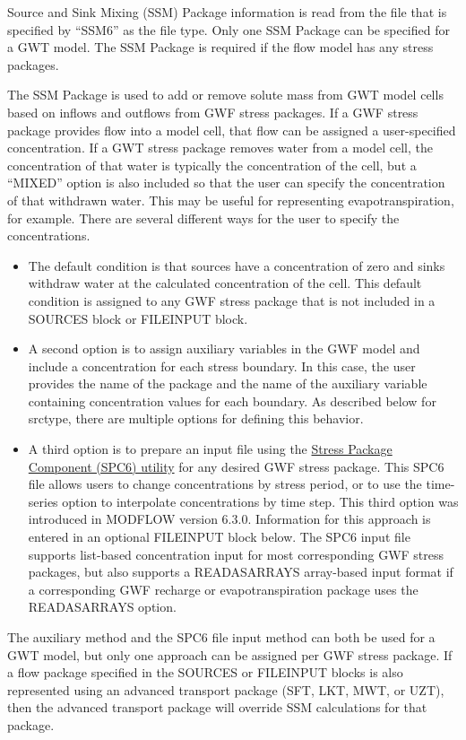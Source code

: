 Source and Sink Mixing (SSM) Package information is read from the file that is specified by ``SSM6'' as the file type.  Only one SSM Package can be specified for a GWT model.  The SSM Package is required if the flow model has any stress packages.

The SSM Package is used to add or remove solute mass from GWT model cells based on inflows and outflows from GWF stress packages.  If a GWF stress package provides flow into a model cell, that flow can be assigned a user-specified concentration.  If a GWT stress package removes water from a model cell, the concentration of that water is typically the concentration of the cell, but a ``MIXED'' option is also included so that the user can specify the concentration of that withdrawn water.  This may be useful for representing evapotranspiration, for example.  There are several different ways for the user to specify the concentrations.  

\begin{itemize}
\item The default condition is that sources have a concentration of zero and sinks withdraw water at the calculated concentration of the cell.  This default condition is assigned to any GWF stress package that is not included in a SOURCES block or FILEINPUT block.
\item A second option is to assign auxiliary variables in the GWF model and include a concentration for each stress boundary.  In this case, the user provides the name of the package and the name of the auxiliary variable containing concentration values for each boundary.  As described below for srctype, there are multiple options for defining this behavior.
\item  A third option is to prepare an input file using the \hyperref[sec:spc]{Stress Package Component (SPC6) utility} for any desired GWF stress package.  This SPC6 file allows users to change concentrations by stress period, or to use the time-series option to interpolate concentrations by time step.  This third option was introduced in MODFLOW version 6.3.0.  Information for this approach is entered in an optional FILEINPUT block below.  The SPC6 input file supports list-based concentration input for most corresponding GWF stress packages, but also supports a READASARRAYS array-based input format if a corresponding GWF recharge or evapotranspiration package uses the READASARRAYS option.
\end{itemize}

\noindent The auxiliary method and the SPC6 file input method can both be used for a GWT model, but only one approach can be assigned per GWF stress package.   If a flow package specified in the SOURCES or FILEINPUT blocks is also represented using an advanced transport package (SFT, LKT, MWT, or UZT), then the advanced transport package will override SSM calculations for that package.

